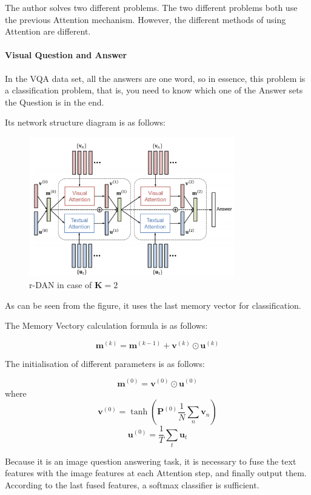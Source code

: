 The author solves two different problems. The two different problems both use the previous Attention mechanism. However, the different methods of using Attention are different.

\paragraph{Visual Question and Answer}

In the VQA data set, all the answers are one word, so in essence, this problem is a classification problem, that is, you need to know which one of the Answer sets the Question is in the end.

Its network structure diagram is as follows:

\begin{figure}[h!]
\centering
\includegraphics[width=0.8\textwidth]{dan2.pdf}
\caption{r-DAN in case of $\mathbf{K}=2$ \cite{dan}}
\label{fig:dan2}
\end{figure}

As can be seen from the figure, it uses the last memory vector for classification.

The Memory Vectory calculation formula is as follows:

$$
\mathbf{m}^{(k)}=\mathbf{m}^{(k-1)}+\mathbf{v}^{(k)} \odot \mathbf{u}^{(k)}
$$

The initialisation of different parameters is as follows:

$$
\mathbf{m}^{(0)}=\mathbf{v}^{(0)} \odot \mathbf{u}^{(0)}
$$
where
$$
\mathbf{v}^{(0)}=\tanh \left(\mathbf{P}^{(0)} \frac{1}{N} \sum_{n} \mathbf{v}_{n}\right)
$$
$$
\mathbf{u}^{(0)}=\frac{1}{T} \sum_{t} \mathbf{u}_{t}
$$

Because it is an image question answering task, it is necessary to fuse the text features with the image features at each Attention step, and finally output them. According to the last fused features, a softmax classifier is sufficient.


